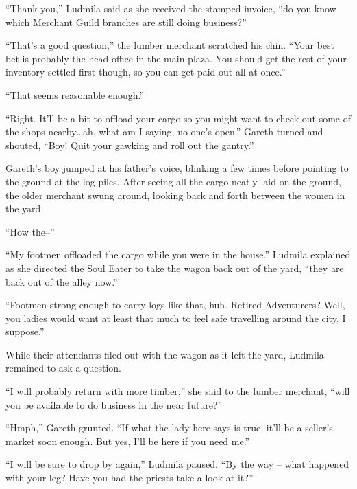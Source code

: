  

“Thank you,” Ludmila said as she received the stamped invoice, “do you know which Merchant Guild branches are still doing business?”

 

“That’s a good question,” the lumber merchant scratched his chin. “Your best bet is probably the head office in the main plaza. You should get the rest of your inventory settled first though, so you can get paid out all at once.”

 

“That seems reasonable enough.”

 

“Right. It’ll be a bit to offload your cargo so you might want to check out some of the shops nearby…ah, what am I saying, no one’s open.” Gareth turned and shouted, “Boy! Quit your gawking and roll out the gantry.”

 

Gareth’s boy jumped at his father’s voice, blinking a few times before pointing to the ground at the log piles. After seeing all the cargo neatly laid on the ground, the older merchant swung around, looking back and forth between the women in the yard.

 

“How the–”

 

“My footmen offloaded the cargo while you were in the house.” Ludmila explained as she directed the Soul Eater to take the wagon back out of the yard, “they are back out of the alley now.”

 

“Footmen strong enough to carry logs like that, huh. Retired Adventurers? Well, you ladies would want at least that much to feel safe travelling around the city, I suppose.”

 

While their attendants filed out with the wagon as it left the yard, Ludmila remained to ask a question.

 

“I will probably return with more timber,” she said to the lumber merchant, “will you be available to do business in the near future?”

 

“Hmph,” Gareth grunted. “If what the lady here says is true, it’ll be a seller’s market soon enough. But yes, I’ll be here if you need me.”

 

“I will be sure to drop by again,” Ludmila paused. “By the way – what happened with your leg? Have you had the priests take a look at it?”


